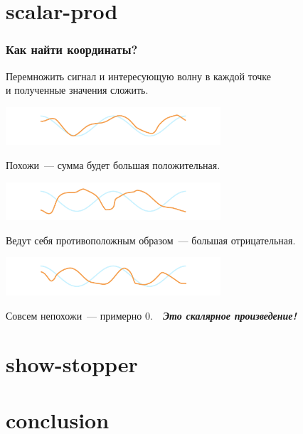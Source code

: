 \documentclass[11pt,aspectratio=169,svgnames]{beamer}
\begin{document}
\section{scalar-prod}

\begin{frame} \frametitle{Как найти координаты?}
Перемножить сигнал и интересующую волну в каждой точке \\
и полученные значения сложить. \medskip

\centerline{\includegraphics[width=0.6\textwidth]{img/sc_bigpos}}\vspace{-4mm}

Похожи~— сумма будет большая положительная. \medskip

\centerline{\includegraphics[width=0.6\textwidth]{img/sc_bigneg}}\vspace{-4mm}

Ведут себя противоположным образом~— большая отрицательная. \medskip

\centerline{\includegraphics[width=0.6\textwidth]{img/sc_orto}}\vspace{-4mm}

Совсем непохожи~— примерно 0.\ \ {\bfseries\itshape Это скалярное произведение!}
\end{frame}

\section{show-stopper}



\section{conclusion}
\end{document}
